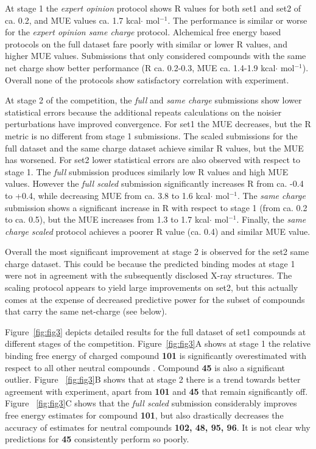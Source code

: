 \documentclass{svjour3}                     %
\begin{document}

At stage 1 the \textit{expert opinion} protocol shows R values for both set1 and set2 of ca.  0.2, and MUE values ca. 1.7 kcal$\cdot$ mol$^{-1}$. The performance is similar or worse for the \textit{expert opinion same charge} protocol. Alchemical free energy based protocols on the full dataset fare poorly with similar or lower R values, and higher MUE values. Submissions that only considered compounds with the same net charge show better performance (R ca. 0.2-0.3, MUE ca. 1.4-1.9 kcal$\cdot$ mol$^{-1}$). Overall none of the protocols show satisfactory correlation with experiment. 

At stage 2 of the competition, the \textit{full} and \textit{same charge} submissions show lower statistical errors because the additional repeats calculations on the noisier perturbations have improved convergence. For set1 the MUE decreases, but the R metric is no different from stage 1 submissions. The scaled submissions for the full dataset and the same charge dataset achieve similar R values, but the MUE has worsened. 
For set2 lower statistical errors are also observed with respect to stage 1. The \textit{full} submission produces similarly low R values and high MUE values. However the \textit{full scaled} submission significantly increases R from ca. -0.4 to +0.4, while decreasing MUE from ca. 3.8 to 1.6 kcal$\cdot$ mol$^{-1}$. The \textit{same charge} submission shows a significant increase in R with respect to stage 1 (from ca. 0.2 to ca. 0.5), but the MUE increases from 1.3 to 1.7 kcal$\cdot$ mol$^{-1}$. Finally, the \textit{same charge scaled} protocol achieves a poorer R value (ca. 0.4) and similar MUE value.

Overall the most significant improvement at stage 2 is observed for the set2 same charge dataset. This could be because the predicted binding modes at stage 1 were not in agreement with the subsequently disclosed X-ray structures. The scaling protocol appears to yield large improvements on set2, but this actually comes at the expense of decreased predictive power for the subset of compounds that carry the same net-charge (see below). 

Figure~\ref{fig:fig3} depicts detailed results for the full dataset of set1 compounds at different stages of the competition. Figure~\ref{fig:fig3}A shows at stage 1 the relative binding free energy of charged compound \textbf{101} is significantly overestimated with respect to all other neutral compounds . Compound \textbf{45} is also a significant outlier.  Figure ~\ref{fig:fig3}B shows that at stage 2 there is a trend towards better agreement with experiment, apart from \textbf{101} and \textbf{45} that remain significantly off.   Figure ~\ref{fig:fig3}C shows that the \textit{full scaled} submission considerably improves free energy estimates for compound \textbf{101}, but also drastically decreases the accuracy of estimates for neutral compounds \textbf{102, 48, 95, 96}. It is not clear why predictions for \textbf{45} consistently perform so poorly. 
\end{document}
